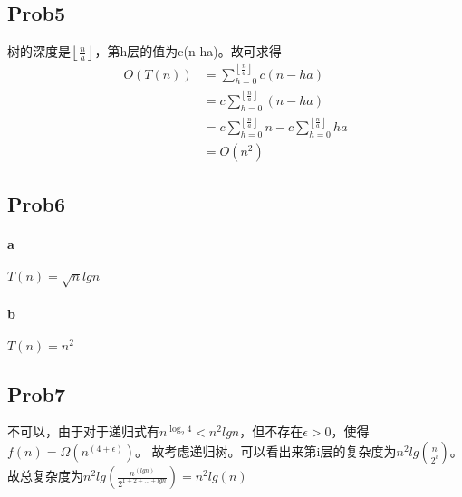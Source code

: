 \documentclass{ctexart}
\begin{document}
\subsection{Prob5}
树的深度是$\left \lfloor \frac{n}{a} \right \rfloor$，第h层的值为c(n-ha)。故可求得
\begin{align*}
    O(T(n)) &=\sum_{h=0}^{\left \lfloor \frac{n}{a} \right \rfloor} c(n-ha) \\
            &=c\sum_{h=0}^{\left \lfloor \frac{n}{a} \right \rfloor} (n-ha) \\
            &=c\sum_{h=0}^{\left \lfloor \frac{n}{a} \right \rfloor}n - c\sum_{h=0}^{\left \lfloor \frac{n}{a} \right \rfloor}ha\\
            &=O(n^2)
\end{align*}

\subsection{Prob6}
\paragraph{a} $T(n)=\sqrt{n} lgn$
\paragraph{b} $T(n)=n^2$

\subsection{Prob7}不可以，由于对于递归式有$n^{\log_2 4} < n^2lgn$，但不存在$\epsilon > 0$，使得$f(n)=\Omega(n^(4+\epsilon))$。
故考虑递归树。可以看出来第i层的复杂度为$n^2lg(\frac{n}{2^i})$。
故总复杂度为$n^2lg(\frac{n^(lgn)}{2^{1+2+...+lgn}})=n^2lg(n)$
\end{document}
